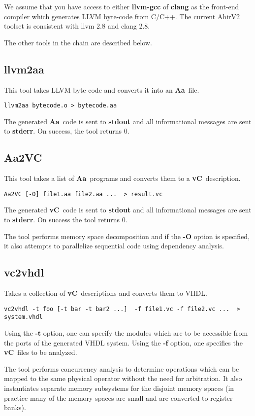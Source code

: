 \documentclass{article}
\newcommand{\Aa}{{\bf Aa}~}
\newcommand{\vC}{{\bf vC}~}
\begin{document}
We assume that you have access to either {\bf llvm-gcc}
of {\bf clang} as the front-end compiler which generates
LLVM byte-code from C/C++.  The current AhirV2 toolset
is consistent with llvm 2.8 and clang 2.8.

The other tools in the chain are described below.

\subsection{{\bf llvm2aa}}

This tool takes LLVM byte code and converts it into an
\Aa file.
\begin{verbatim}
llvm2aa bytecode.o > bytecode.aa
\end{verbatim}
The generated \Aa code is sent to {\bf stdout} and all informational
messages are sent to {\bf stderr}.  On success, the tool returns 0.


\subsection{{\bf Aa2VC}}

This tool takes a list of \Aa programs and converts them
to a \vC description. 
\begin{verbatim}
Aa2VC [-O] file1.aa file2.aa ...  > result.vc
\end{verbatim}
The generated \vC code is sent to {\bf stdout} and all informational
messages are sent to {\bf stderr}.  On success the tool returns 0.

The tool performs memory space decomposition and if the {\bf -O} option
is specified, it also attempts to parallelize sequential code using 
dependency analysis.

\subsection{\bf vc2vhdl}

Takes a collection of \vC descriptions and converts them to
VHDL.
\begin{verbatim}
vc2vhdl -t foo [-t bar -t bar2 ...]  -f file1.vc -f file2.vc ...  > system.vhdl
\end{verbatim}
Using the {\bf -t} option, one can specify the modules which are to be 
accessible from the ports of the generated VHDL system.
Using the {\bf -f} option, one specifies the \vC files to be analyzed.

The tool performs concurrency analysis to determine operations which
can be mapped to the same physical operator without the need for
arbitration.  It also instantiates separate memory subsystems for
the disjoint memory spaces (in practice many of the memory spaces
are small and are converted to register banks).
\end{document}
